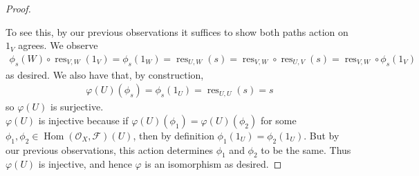 \documentclass{article}
\newcommand{\fO}{\mathscr{O}}
\newcommand{\fF}{\mathscr{F}}
\DeclareMathOperator{\res}{res}
\DeclareMathOperator{\Hom}{Hom}
\begin{document}
\begin{proof}
\begin{center}
    \end{center}
    To see this, by our previous observations it suffices to show both paths action on $1_V$ agrees. We observe
    \begin{align*}
        \phi_s(W)\circ \res_{V,W}(1_V)=\phi_s(1_W)=\res_{U,W}(s)=\res_{V,W}\circ \res_{U,V}(s)=\res_{V,W}\circ \phi_s(1_V)
    \end{align*}
    as desired. We also have that, by construction,
    \begin{align*}
        \varphi(U)(\phi_s)=\phi_s(1_U)=\res_{U,U}(s)=s
    \end{align*}
    so $\varphi(U)$ is surjective.\\
    $\varphi(U)$ is injective because if $\varphi(U)(\phi_1)=\varphi(U)(\phi_2)$ for some $\phi_1,\phi_2\in \Hom(\fO_X,\fF)(U)$, then by definition $\phi_1(1_U)=\phi_2(1_U)$. But by our previous observations, this action determines $\phi_1$ and $\phi_2$ to be the same. Thus $\varphi(U)$ is injective, and hence $\varphi$ is an isomorphism as desired.
\end{proof}
\end{document}
